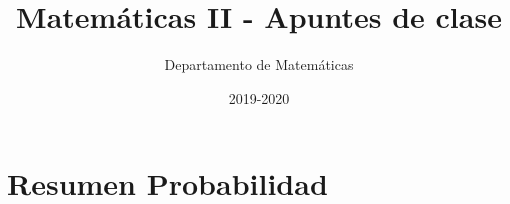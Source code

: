 \documentclass[nobuilddate,nochap]{Docencia}
\title{Matemáticas II - Apuntes de clase}
\author{Departamento de Matemáticas}
\date{2019-2020}
\begin{document}
\pagestyle{plain}
\section{Resumen Probabilidad}
%
\end{document}
